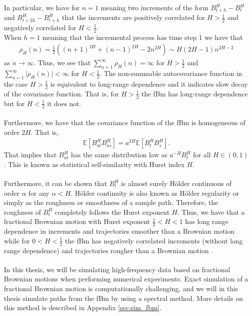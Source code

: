 \documentclass{article}
\begin{document}
In particular, we have for $n=1$ meaning two increments of the form $B^H_{t+h}-B^H_{t}$ and $B^H_{t+2h}-B^H_{t+h}$ that the increments are positively correlated for $H>\frac{1}{2}$ and negatively correlated for $H<\frac{1}{2}$.\\
When $h=1$ meaning that the incremental process has time step 1 we have that
\begin{align*}
\rho_H(n) = \frac{1}{2}\left( (n+1)^{2H} +(n-1)^{2H} -2n^{2H}\right) \sim H(2H-1)n^{2H-2}
\end{align*}
as $n\rightarrow \infty$. Thus, we see that $\sum_{n=1}^\infty \rho_H(n) =\infty$ for $H>\frac{1}{2}$ and $\sum_{n=1}^\infty \lvert \rho_H(n) \rvert <\infty$ for $H<\frac{1}{2}$. The non-summable autocovariance function in the case $H>\frac{1}{2}$ is equivalent to long-range dependence and it indicates slow decay of the covariance function. That is, for $H>\frac{1}{2}$ the fBm has long-range dependence but for $H<\frac{1}{2}$ it does not. \\\\
Furthermore, we have that the covariance function of the fBm is homogeneous of order $2H$. That is, 
\begin{align*}
\mathbb{E}\left[B_{at}^HB_{as}^H\right] = a^{2H} \mathbb{E}\left[B_t^HB_s^H\right].
\end{align*}
That implies that $B_{at}^H$ has the same distribution law as $a^{-H}B_t^H$ for all $H\in (0,1)$. This is known as statistical self-similarity with Hurst index $H$.\\\\
Furthermore, it can be shown that $B_t^H$ is almost surely Hölder continuous of order $\alpha$ for any $\alpha < H$. Hölder continuity is also known as Hölder regularity or simply as the roughness or smoothness of a sample path. Therefore, the roughness of $B_t^H$ completely follows the Hurst exponent $H$. Thus, we have that a fractional Brownian motion with Hurst exponent $\frac{1}{2}<H<1$ has long range dependence in increments and trajectories smoother than a Brownian motion while for $0<H<\frac{1}{2}$ the fBm has negatively correlated increments (without long range dependence) and trajectories rougher than a Brownian motion \cite{biagini2008}.\\\\
In this thesis, we will be simulating high-frequency data based on fractional Brownian motions when performing numerical experiments. Exact simulation of a fractional Brownian motion is computationally challenging, and we will in this thesis simulate paths from the fBm by using a spectral method. More details on this method is described in Appendix \ref{sec:sim_fbm}.
\end{document}
